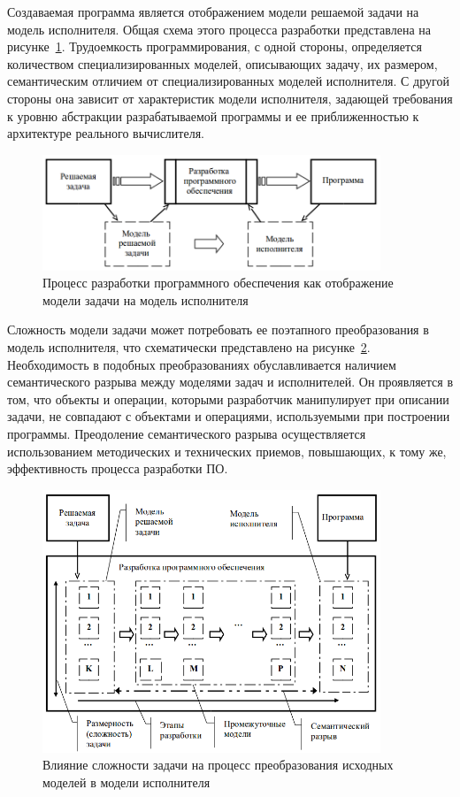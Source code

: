 Создаваемая программа является отображением модели решаемой задачи на модель исполнителя. Общая схема этого процесса разработки представлена на рисунке~\ref{fig01-01}. Трудоемкость программирования, с одной стороны, определяется количеством специализированных моделей, описывающих задачу, их размером, семантическим отличием от специализированных моделей исполнителя. С другой стороны она зависит от характеристик модели исполнителя, задающей требования к уровню абстракции разрабатываемой программы и ее приближенностью к архитектуре реального вычислителя.

\begin{figure}[htbp]
    \centering
    \includegraphics[width=0.9\textwidth]{img/fig01-01.png}
    \caption[Процесс разработки ПО]{Процесс разработки программного обеспечения как отображение модели задачи на модель исполнителя}
    \label{fig01-01}
\end{figure}

Сложность модели задачи может потребовать ее поэтапного преобразования в модель исполнителя, что схематически представлено на рисунке~\ref{fig01-02}. Необходимость в подобных преобразованиях обуславливается наличием семантического разрыва между моделями задач и исполнителей. Он проявляется в том, что объекты и операции, которыми разработчик манипулирует при описании задачи, не совпадают с объектами и операциями, используемыми при построении программы. Преодоление семантического разрыва осуществляется использованием методических и технических приемов, повышающих, к тому же, эффективность процесса разработки ПО.

\begin{figure}[htbp]
    \centering
    \includegraphics[width=0.9\textwidth]{img/fig01-02.png}
    \caption[Сложность преобразования моделей]{Влияние сложности задачи на процесс преобразования исходных моделей в модели исполнителя}
    \label{fig01-02}
\end{figure}

